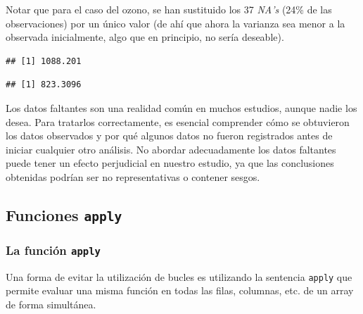 \documentclass[
]{book}
\newenvironment{Shaded}{\begin{snugshade}}{\end{snugshade}}
\newcommand{\AttributeTok}[1]{\textcolor[rgb]{0.13,0.29,0.53}{#1}}
\newcommand{\FunctionTok}[1]{\textcolor[rgb]{0.13,0.29,0.53}{\textbf{#1}}}
\newcommand{\NormalTok}[1]{#1}
\newcommand{\SpecialCharTok}[1]{\textcolor[rgb]{0.81,0.36,0.00}{\textbf{#1}}}
\begin{document}
Notar que para el caso del ozono, se han sustituido los 37 \emph{NA's} (24\% de las observaciones) por un único valor (de ahí que ahora la varianza sea menor a la observada inicialmente, algo que en principio, no sería deseable).

\begin{Shaded}
\end{Shaded}

\begin{verbatim}
## [1] 1088.201
\end{verbatim}

\begin{Shaded}
\end{Shaded}

\begin{verbatim}
## [1] 823.3096
\end{verbatim}

Los datos faltantes son una realidad común en muchos estudios, aunque nadie los desea. Para tratarlos correctamente, es esencial comprender cómo se obtuvieron los datos observados y por qué algunos datos no fueron registrados antes de iniciar cualquier otro análisis. No abordar adecuadamente los datos faltantes puede tener un efecto perjudicial en nuestro estudio, ya que las conclusiones obtenidas podrían ser no representativas o contener sesgos.

\hypertarget{funciones-apply}{%
\subsection{\texorpdfstring{Funciones \texttt{apply}}{Funciones apply}}\label{funciones-apply}}

\hypertarget{la-funciuxf3n-apply}{%
\subsubsection{\texorpdfstring{La función \texttt{apply}}{La función apply}}\label{la-funciuxf3n-apply}}

Una forma de evitar la utilización de bucles es utilizando la sentencia \texttt{apply} que permite evaluar una misma función en todas las filas, columnas, etc. de un array de forma simultánea.
\end{document}
